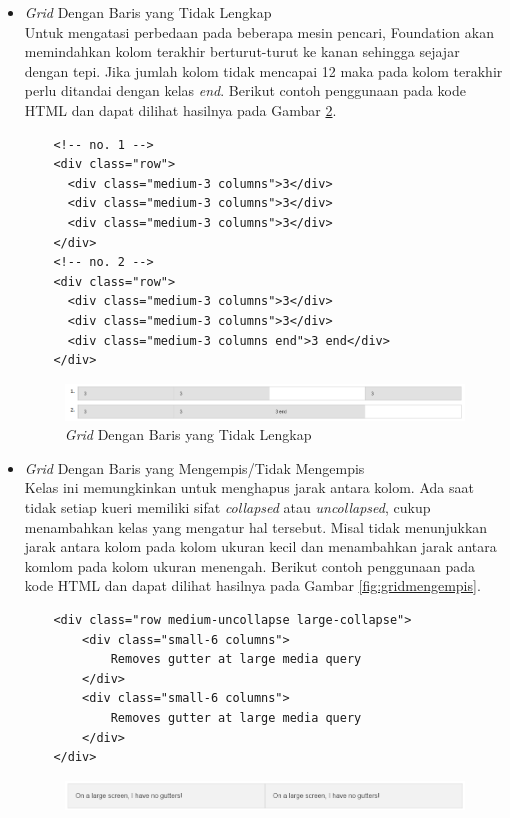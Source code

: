 \begin{enumerate}[(1)]
\begin{itemize}
\begin{figure}[H]
	\label{fig:gridoffset}
	\end{figure}
  \item {\it Grid} Dengan Baris yang Tidak Lengkap\\
  Untuk mengatasi perbedaan pada beberapa mesin pencari, Foundation akan
  memindahkan kolom terakhir berturut-turut ke kanan sehingga sejajar dengan
  tepi. Jika jumlah kolom tidak mencapai 12 maka pada kolom terakhir perlu
  ditandai dengan kelas {\it end}. Berikut contoh penggunaan pada
  kode HTML dan dapat dilihat hasilnya pada Gambar \ref{fig:gridtidaklengkap}.
  	\begin{lstlisting}
  	<!-- no. 1 -->
  	<div class="row">
	  <div class="medium-3 columns">3</div>
	  <div class="medium-3 columns">3</div>
	  <div class="medium-3 columns">3</div>
	</div>
	<!-- no. 2 -->
	<div class="row">
	  <div class="medium-3 columns">3</div>
	  <div class="medium-3 columns">3</div>
	  <div class="medium-3 columns end">3 end</div>
	</div>
  	\end{lstlisting}
  	\begin{figure}[H]
	\centering
	\includegraphics[scale=0.6]{Gambar/gridtidaklengkap.png}
	\caption[{\it Grid} Dengan Baris yang Tidak Lengkap]{{\it Grid} Dengan Baris
	yang Tidak Lengkap}
	\label{fig:gridtidaklengkap}
	\end{figure}
  \item {\it Grid} Dengan Baris yang Mengempis/Tidak Mengempis\\
  Kelas ini memungkinkan untuk menghapus jarak antara kolom. Ada saat tidak
  setiap kueri memiliki sifat {\it collapsed} atau {\it uncollapsed}, cukup
  menambahkan kelas yang mengatur hal tersebut. Misal tidak menunjukkan jarak
  antara kolom pada kolom ukuran kecil dan menambahkan jarak antara komlom pada
  kolom ukuran menengah. Berikut contoh penggunaan pada kode HTML dan dapat
  dilihat hasilnya pada Gambar \ref{fig:gridmengempis}.
  	\begin{lstlisting}
  	<div class="row medium-uncollapse large-collapse">
	    <div class="small-6 columns">
	        Removes gutter at large media query
	    </div>
	    <div class="small-6 columns">
	        Removes gutter at large media query
	    </div>
	</div>
  	\end{lstlisting}
  	\begin{figure}[H]
	\centering
	\includegraphics[scale=0.6]{Gambar/gridmengempis.png}

\end{figure}
\end{itemize}
\end{enumerate}
